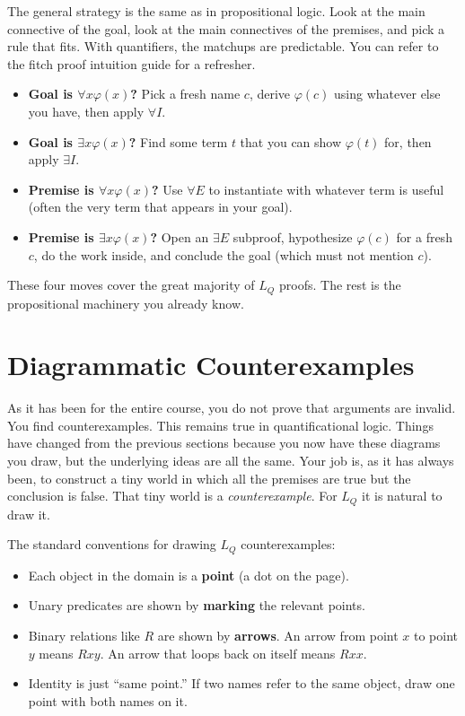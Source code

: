 \documentclass[11pt]{article}
\begin{document}
The general strategy is the same as in propositional logic. Look at the main connective of the goal, look at the main connectives of the premises, and pick a rule that fits. With quantifiers, the matchups are predictable. You can refer to the fitch proof intuition guide for a refresher.

\begin{template}
\begin{itemize}[leftmargin=*]
    \item \textbf{Goal is $\forall x \varphi(x)$?} Pick a fresh name $c$, derive $\varphi(c)$ using whatever else you have, then apply $\forall I$.
    \item \textbf{Goal is $\exists x \varphi(x)$?} Find some term $t$ that you can show $\varphi(t)$ for, then apply $\exists I$.
    \item \textbf{Premise is $\forall x \varphi(x)$?} Use $\forall E$ to instantiate with whatever term is useful (often the very term that appears in your goal).
    \item \textbf{Premise is $\exists x \varphi(x)$?} Open an $\exists E$ subproof, hypothesize $\varphi(c)$ for a fresh $c$, do the work inside, and conclude the goal (which must not mention $c$).
\end{itemize}
\end{template}

These four moves cover the great majority of $L_Q$ proofs. The rest is the propositional machinery you already know.

\section{Diagrammatic Counterexamples}

As it has been for the entire course, you do not prove that arguments are invalid. You find counterexamples. This remains true in quantificational logic. Things have changed from the previous sections because you now have these diagrams you draw, but the underlying ideas are all the same. Your job is, as it has always been, to construct a tiny world in which all the premises are true but the conclusion is false. That tiny world is a \emph{counterexample}. For $L_Q$ it is natural to draw it.

The standard conventions for drawing $L_Q$ counterexamples:

\begin{itemize}[leftmargin=*]
    \item Each object in the domain is a \textbf{point} (a dot on the page).
    \item Unary predicates are shown by \textbf{marking} the relevant points. 
    \item Binary relations like $R$ are shown by \textbf{arrows}. An arrow from point $x$ to point $y$ means $Rxy$. An arrow that loops back on itself means $Rxx$.
    \item Identity is just ``same point.'' If two names refer to the same object, draw one point with both names on it.
\end{itemize}
\end{document}
